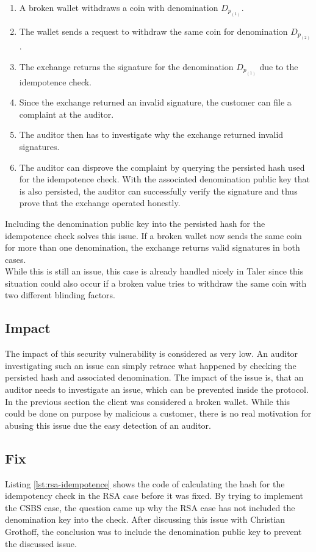 \begin{enumerate}
    \item A broken wallet withdraws a coin with denomination $D_{p_{(1)}}$.
    \item The wallet sends a request to withdraw the same coin for denomination $D_{p_{(2)}}$.
    \item The exchange returns the signature for the denomination $D_{p_{(1)}}$ due to the \gls{idempotence} check.
    \item Since the exchange returned an invalid signature, the customer can file a complaint at the auditor.
    \item The auditor then has to investigate why the exchange returned invalid signatures.
    \item The auditor can disprove the complaint by querying the persisted hash used for the \gls{idempotence} check.
    With the associated denomination public key that is also persisted, the auditor can successfully verify the signature and thus prove that the exchange operated honestly.
\end{enumerate}

Including the denomination public key into the persisted hash for the \gls{idempotence} check solves this issue.
If a broken wallet now sends the same coin for more than one denomination, the exchange returns valid signatures in both cases.\\
While this is still an issue, this case is already handled nicely in Taler since this situation could also occur if a broken value tries to withdraw the same coin with two different blinding factors.

\subsection{Impact}
The impact of this security vulnerability is considered as very low.
An auditor investigating such an issue can simply retrace what happened by checking the persisted hash and associated denomination.
The impact of the issue is, that an auditor needs to investigate an issue, which can be prevented inside the protocol.
\\
In the previous section the client was considered a broken wallet.
While this could be done on purpose by malicious a customer, there is no real motivation for abusing this issue due the easy detection of an auditor.


\subsection{Fix}
Listing \ref{lst:rsa-idempotence} shows the code of calculating the hash for the idempotency check in the RSA case before it was fixed.
By trying to implement the \gls{CSBS} case, the question came up why the RSA case has not included the denomination key into the check.
After discussing this issue with Christian Grothoff, the conclusion was to include the denomination public key to prevent the discussed issue.

